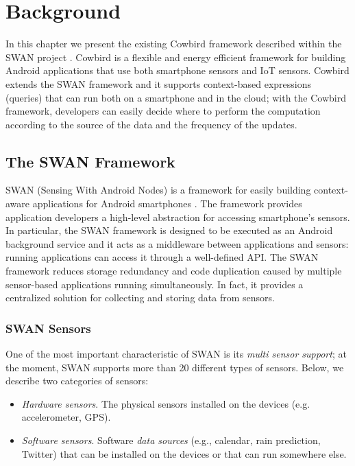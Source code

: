 \chapter{Background}

In this chapter we present the existing Cowbird framework described within the SWAN project \cite{swanonline}. Cowbird is a flexible and energy efficient framework for building Android applications that use both smartphone sensors and IoT sensors\cite{cowbirdarticle}. Cowbird extends the SWAN framework \cite{swanphd} and it supports context-based expressions (queries) that can run both on a smartphone and in the cloud; with the Cowbird framework, developers can easily decide where to perform the computation according to the source of the data and the frequency of the updates.

\section{The SWAN Framework}
SWAN (Sensing With Android Nodes) is a framework for easily building context-aware applications for Android smartphones \cite{swanphd}. The framework provides application developers a high-level abstraction for accessing smartphone's sensors. In particular, the SWAN framework is designed to be executed as an Android background service and it acts as a middleware between applications and sensors: running applications can access it through a well-defined API. The SWAN framework reduces storage redundancy and code duplication caused by multiple sensor-based applications running simultaneously. In fact, it provides a centralized solution for collecting and storing data from sensors. 

\subsection{SWAN Sensors}
One of the most important characteristic of SWAN is its \emph{multi sensor support}; at the moment, SWAN supports more than 20 different types of sensors. Below, we describe two categories of sensors:
\begin{itemize}
\item	 \emph{Hardware sensors}. The physical sensors installed on the devices (e.g. accelerometer, GPS).
\item \emph{Software sensors}. Software \emph{data sources} (e.g., calendar, rain prediction, Twitter) that can be installed on the devices or that can run somewhere else. 
\end{itemize}

